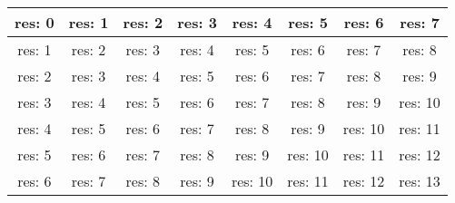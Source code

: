 \documentclass{article}
\begin{document}
\begin{tabular}{|c|c|c|c|c|c|c|c|}
\hline
res: 0 & res: 1 & res: 2 & res: 3 & res: 4 & res: 5 & res: 6 & res: 7 \\
\hline
res: 1 & res: 2 & res: 3 & res: 4 & res: 5 & res: 6 & res: 7 & res: 8 \\
\hline
res: 2 & res: 3 & res: 4 & res: 5 & res: 6 & res: 7 & res: 8 & res: 9 \\
\hline
res: 3 & res: 4 & res: 5 & res: 6 & res: 7 & res: 8 & res: 9 & res: 10 \\
\hline
res: 4 & res: 5 & res: 6 & res: 7 & res: 8 & res: 9 & res: 10 & res: 11 \\
\hline
res: 5 & res: 6 & res: 7 & res: 8 & res: 9 & res: 10 & res: 11 & res: 12 \\
\hline
res: 6 & res: 7 & res: 8 & res: 9 & res: 10 & res: 11 & res: 12 & res: 13 \\
\hline
\end{tabular}
\end{document}
